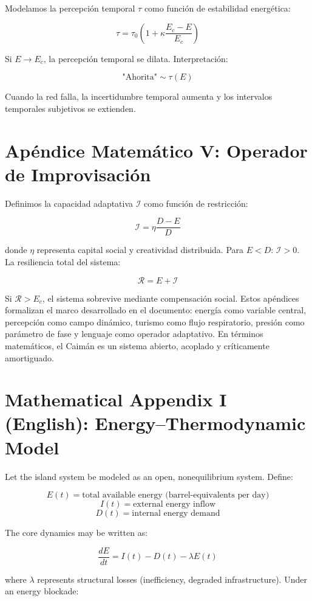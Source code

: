 \documentclass[12pt]{article}
\begin{document}
Modelamos la percepción temporal \( \tau \) como función de estabilidad energética:

\[
\tau = \tau_0 \left(1 + \kappa \frac{E_c - E}{E_c}\right)
\]

Si \( E \to E_c \), la percepción temporal se dilata. Interpretación:

\[
\text{"Ahorita"} \sim \tau(E)
\]

Cuando la red falla, la incertidumbre temporal aumenta y los intervalos temporales subjetivos se extienden.

\section{Apéndice Matemático V: Operador de Improvisación}

Definimos la capacidad adaptativa \( \mathcal{I} \) como función de restricción:

\[
\mathcal{I} = \eta \frac{D - E}{D}
\]

donde \( \eta \) representa capital social y creatividad distribuida. Para \( E < D \): \( \mathcal{I} > 0 \). La resiliencia total del sistema:

\[
\mathcal{R} = E + \mathcal{I}
\]

Si \( \mathcal{R} > E_c \), el sistema sobrevive mediante compensación social. Estos apéndices formalizan el marco desarrollado en el documento: energía como variable central, percepción como campo dinámico, turismo como flujo respiratorio, presión como parámetro de fase y lenguaje como operador adaptativo. En términos matemáticos, el Caimán es un sistema abierto, acoplado y críticamente amortiguado.

\section{Mathematical Appendix I (English): Energy--Thermodynamic Model}

Let the island system be modeled as an open, nonequilibrium system. Define:

\[
E(t) = \text{total available energy (barrel-equivalents per day)}
\]
\[
I(t) = \text{external energy inflow}
\]
\[
D(t) = \text{internal energy demand}
\]

The core dynamics may be written as:

\[
\frac{dE}{dt} = I(t) - D(t) - \lambda E(t)
\]

where \( \lambda \) represents structural losses (inefficiency, degraded infrastructure). Under an energy blockade:
\end{document}
